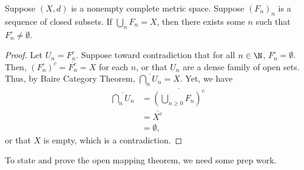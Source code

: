 \documentclass[10pt]{mypackage}
\begin{document}
\begin{corollary}
  Suppose $\left( X,d \right)$ is a nonempty complete metric space. Suppose $\left( F_n \right)_n$ is a sequence of closed subsets. If $\bigcup_{n}F_n = X$, then there exists some $n$ such that $F_n^{\circ}\neq \emptyset$.
\end{corollary}
\begin{proof}
  Let $U_n = F_n^{c}$. Suppose toward contradiction that for all $n\in \N$, $F_n^{\circ} = \emptyset$. Then, $ \left( F_n^{\circ} \right)^{c} = \overline{F_n^{c}} = X $ for each $n$, or that $ U_n $ are a dense family of open sets. Thus, by Baire Category Theorem, $ \overline{\bigcap_{n}U_n} = X $. Yet, we have
  \begin{align*}
    \overline{\bigcap_{n} U_n} &= \overline{\left( \bigcup_{n\geq 0}F_n \right)^{c}}\\
                               &= \overline{X^{c}}\\
                               &= \emptyset,
  \end{align*}
  or that $X$ is empty, which is a contradiction.
\end{proof}
To state and prove the open mapping theorem, we need some prep work.
\end{document}

